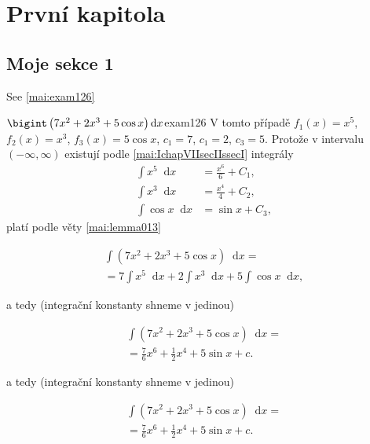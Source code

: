 \documentclass[twocolumn]{scrbook}
\newcommand{\dd}[1]{\mathop{}\!\mathrm{d}#1}
\begin{document}
\chapter{První kapitola}
\section{Moje sekce 1}
  \blindtext 
  
  See \ref{mai:exam126}

  \begin{mathexam}{\(\bigint\left(7x^2+2x^3+5\cos x\right)\dd{x}\)}{exam126}
    V tomto případě \(f_1(x) = x^5\), \(f_2(x) = x^3\), \(f_3(x) = 5\cos x\), \(c_1=7\), \(c_1=2\),
    \(c_3=5\). Protože v intervalu \((-\infty, \infty)\) existují podle
    \eqref{mai:IchapVIIsecIIssecI} integrály
    \begin{align*}
      \int x^5\dd{x}   &= \frac{x^6}{6} + C_1, \\
      \int x^3\dd{x}   &= \frac{x^4}{4} + C_2, \\
      \int\cos x\dd{x} &= \sin x +C_3,
    \end{align*}
    platí podle věty \eqref{mai:lemma013} 
    \begin{fleqn}[0pt]
      \begin{multline*}
        \int(7x^2+2x^3+5\cos x)\dd{x} = \\
          = 7\int x^5\dd{x} + 2\int x^3\dd{x} + 5\int\cos x\dd{x},
      \end{multline*}
    \end{fleqn}
      a tedy (integrační konstanty shneme v jedinou)
      \begin{fleqn}[0pt]
        \begin{multline*}
          \int(7x^2+2x^3+5\cos x)\dd{x} = \\
            = \frac{7}{6}x^6 + \frac{1}{2}x^4 + 5\sin x + c.
        \end{multline*}
      \end{fleqn}
      a tedy (integrační konstanty shneme v jedinou)
      \begin{fleqn}[0pt]
        \begin{multline*}
          \int(7x^2+2x^3+5\cos x)\dd{x} = \\
            = \frac{7}{6}x^6 + \frac{1}{2}x^4 + 5\sin x + c.
        \end{multline*}
      \end{fleqn}
  \end{mathexam}
  \blindtext
\end{document}
